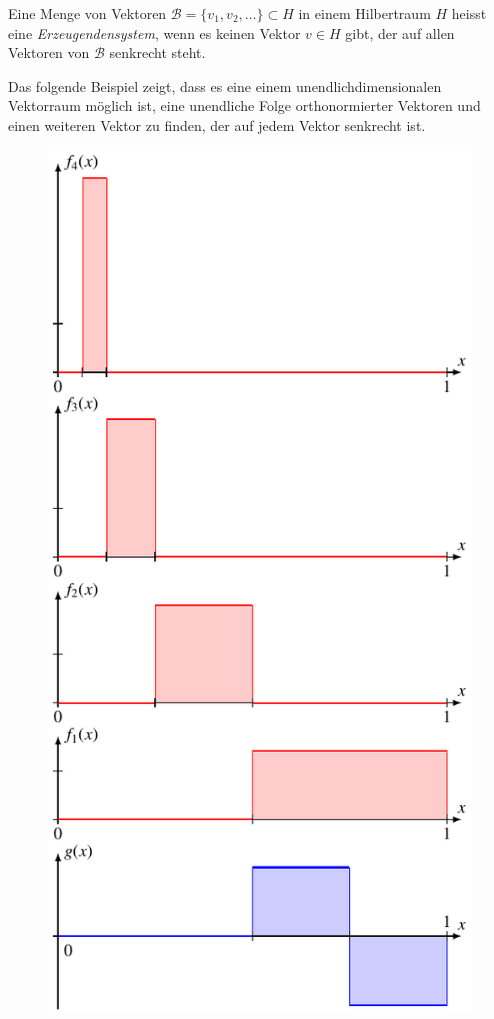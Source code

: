 \begin{definition}
\label{geometrie:erzeugendensystem}
Eine Menge von Vektoren $\mathcal{B} = \{v_1,v_2,\dots\}\subset H$ in einem
Hilbertraum $H$ heisst eine {\em Erzeugendensystem}, wenn es keinen Vektor
%
$v\in H$ gibt, der auf allen Vektoren von $\mathcal{B}$ senkrecht steht.
\end{definition}

Das folgende Beispiel zeigt, dass es eine einem unendlichdimensionalen
Vektorraum möglich ist, eine unendliche Folge orthonormierter Vektoren
und einen weiteren Vektor zu finden, der auf jedem Vektor senkrecht ist.

\begin{beispiel}
\label{geometrie:l2-beispiel}
\begin{figure}
\centering
\includegraphics{chapters/1-geometrie/images/l2orth.pdf}

\end{figure}
\end{beispiel}
